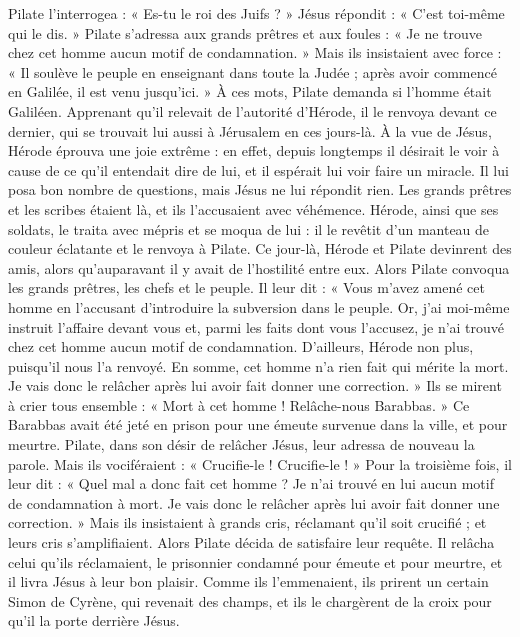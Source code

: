  Pilate l’interrogea : « Es-tu le roi des Juifs ? » Jésus répondit : « C’est toi-même qui le dis. »
 Pilate s’adressa aux grands prêtres et aux foules : « Je ne trouve chez cet homme aucun motif de condamnation. »
 Mais ils insistaient avec force : « Il soulève le peuple en enseignant dans toute la Judée ; après avoir commencé en Galilée, il est venu jusqu’ici. »
 À ces mots, Pilate demanda si l’homme était Galiléen.
 Apprenant qu’il relevait de l’autorité d’Hérode, il le renvoya devant ce dernier, qui se trouvait lui aussi à Jérusalem en ces jours-là.
 À la vue de Jésus, Hérode éprouva une joie extrême : en effet, depuis longtemps il désirait le voir à cause de ce qu’il entendait dire de lui, et il espérait lui voir faire un miracle.
 Il lui posa bon nombre de questions, mais Jésus ne lui répondit rien.
 Les grands prêtres et les scribes étaient là, et ils l’accusaient avec véhémence.
 Hérode, ainsi que ses soldats, le traita avec mépris et se moqua de lui : il le revêtit d’un manteau de couleur éclatante et le renvoya à Pilate.
 Ce jour-là, Hérode et Pilate devinrent des amis, alors qu’auparavant il y avait de l’hostilité entre eux.
 Alors Pilate convoqua les grands prêtres, les chefs et le peuple.
 Il leur dit : « Vous m’avez amené cet homme en l’accusant d’introduire la subversion dans le peuple. Or, j’ai moi-même instruit l’affaire devant vous et, parmi les faits dont vous l’accusez, je n’ai trouvé chez cet homme aucun motif de condamnation.
 D’ailleurs, Hérode non plus, puisqu’il nous l’a renvoyé. En somme, cet homme n’a rien fait qui mérite la mort.
 Je vais donc le relâcher après lui avoir fait donner une correction. »
 Ils se mirent à crier tous ensemble : « Mort à cet homme ! Relâche-nous Barabbas. »
 Ce Barabbas avait été jeté en prison pour une émeute survenue dans la ville, et pour meurtre.
 Pilate, dans son désir de relâcher Jésus, leur adressa de nouveau la parole.
 Mais ils vociféraient : « Crucifie-le ! Crucifie-le ! »
 Pour la troisième fois, il leur dit : « Quel mal a donc fait cet homme ? Je n’ai trouvé en lui aucun motif de condamnation à mort. Je vais donc le relâcher après lui avoir fait donner une correction. »
 Mais ils insistaient à grands cris, réclamant qu’il soit crucifié ; et leurs cris s’amplifiaient.
 Alors Pilate décida de satisfaire leur requête.
 Il relâcha celui qu’ils réclamaient, le prisonnier condamné pour émeute et pour meurtre, et il livra Jésus à leur bon plaisir.
 Comme ils l’emmenaient, ils prirent un certain Simon de Cyrène, qui revenait des champs, et ils le chargèrent de la croix pour qu’il la porte derrière Jésus.
